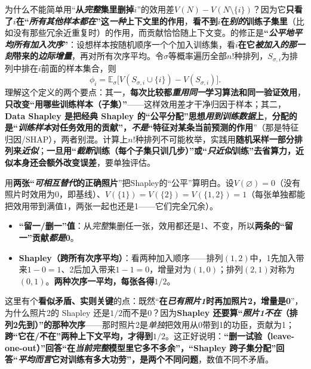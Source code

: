 为什么不能简单用“\textbf{从\emph{完整}集里删掉$i$}”的效用差$V(N)-V(N\setminus\{i\})$？因为它\textbf{只看了$i$在“\emph{所有其他样本都在}”这\emph{一种}上下文里的作用}，\textbf{看不到$i$在\emph{别的}训练子集里}（比如没有那些冗余近重复时）的作用，而贡献恰恰随上下文变。的修正是\textbf{“\emph{公平地平均所有\emph{加入次序}}”}：设想样本按随机顺序一个个加入训练集，看$i$\textbf{在它\emph{被加入的那一刻}带来的\emph{边际增量}}，再对所有次序平均。令$\sigma$等概率遍历全部$n!$种排列，$S_{\sigma,i}$为排列中排在$i$前面的样本集合，则
\begin{equation}
  \phi_i
  =\mathbb E_{\sigma}
    \bigl[V(S_{\sigma,i}\cup\{i\})-V(S_{\sigma,i})\bigr].
  \label{eq:ka-data-shapley}
\end{equation}
理解这个定义的两个要点：其一，\textbf{每次比较都\emph{重用同一}学习算法和同一验证效用}，\textbf{只改变“用哪些训练样本（子集）”}——这样效用差才干净归因于样本；其二，\textbf{Data Shapley 是把经典 Shapley 的“公平分配”思想\emph{用到训练数据}上}，\textbf{分配的是“\emph{训练样本}对任务效用的贡献”，\emph{不是}“特征对某条当前预测的作用}”（那是特征归因/SHAP），两者别混。计算上$n!$种排列不可能枚举，实践用\textbf{随机采样一部分排列来\emph{近似}}；\textbf{一旦用“\emph{截断}训练（每个子集只训几步）”或“\emph{只近似}训练”去省算力，近似本身\textbf{还会额外改变误差}}，要单独评估。

用\textbf{两张“\emph{可相互替代}的正确照片}”把Shapley的“公平”算明白。设$V(\varnothing)=0$（没有照片时效用为0，即基线）、$V(\{1\})=V(\{2\})=V(\{1,2\})=1$（每张单独都能把效用带到满值1，两张一起也还是1——它们完全冗余）。
\begin{itemize}\item \textbf{“留一/删一”值}：从\emph{完整}集删任一张，效用都还是1、不变，所以\textbf{两条的“留一”贡献\emph{都是}0}。\item \textbf{Shapley（跨所有次序平均）}：看两种加入顺序——排列$(1,2)$中，1先加入带来$1-0=1$、2后加入带来$1-1=0$，增量对为$(1,0)$；排列$(2,1)$对称为$(0,1)$。\textbf{两种次序一平均，每张各得$1/2$}。\end{itemize}
这里有个\textbf{看似矛盾、实则关键}的点：既然“\textbf{在\emph{已有照片1}时再加照片2，增量是0}”，为什么照片2的 Shapley 还是$1/2$而不是0？因为\textbf{Shapley 还要算“\emph{照片1\emph{不在}}（排列2先到）”的那种次序}——那时照片2是\emph{单独}把效用从0带到1的功臣，贡献为1；\textbf{跨“它在/不在”两种上下文平均，才得到$1/2$}。这正好说明：\textbf{“删一试验（leave-one-out）”回答“在\emph{当前完整}模型里它多不多余”，“Shapley 跨子集分配”回答“\emph{平均而言}它对训练有多大功劳”，是两个不同问题}，数值不同不矛盾。

